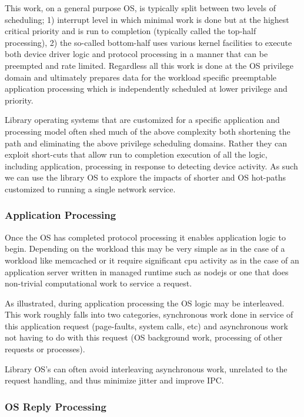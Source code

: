 This work, on a general purpose OS, is typically split between two levels of scheduling; 1) interrupt level in which minimal work is done but at the highest critical priority and is run to completion (typically called the top-half processing), 2) the so-called bottom-half uses various kernel facilities to execute both device driver logic and protocol processing in a manner that can be preempted and rate limited.  Regardless all this work is done at the OS privilege domain and ultimately prepares data for the workload specific preemptable    application processing which is independently scheduled at lower privilege and priority. 

Library operating systems that are customized for a specific application and processing model often shed much of the above complexity both shortening the path and eliminating the above privilege scheduling domains\cite{10.1145/2997641,10.1145/2812806,EbbRT}.  Rather they can exploit short-cuts that allow run to completion execution of all the logic, including application, processing in response to detecting device activity.  As such we can use the library OS to explore the impacts of shorter and OS hot-paths customized to running a single network service.  

\subsubsection{Application Processing}
\label{sec:workflow:appproc}

Once the OS has completed protocol processing it enables application logic to begin.  Depending on the workload this may be very simple as in the case of a workload like memcached or it require significant cpu activity as in the case of  an application server written in managed runtime such as nodejs or one that does non-trivial computational work to service a request. 

As illustrated, during application processing the OS logic may be interleaved.  This work roughly falls into two categories, synchronous work done in service of this application request (page-faults, system calls, etc) and asynchronous work not having to do with this request (OS background work, processing of other requests or processes).

Library OS's can often avoid interleaving asynchronous work, unrelated to the request handling,  and thus minimize jitter and improve IPC. 

\subsubsection{OS Reply Processing}
\label{sec:workflow:osrepproc}

